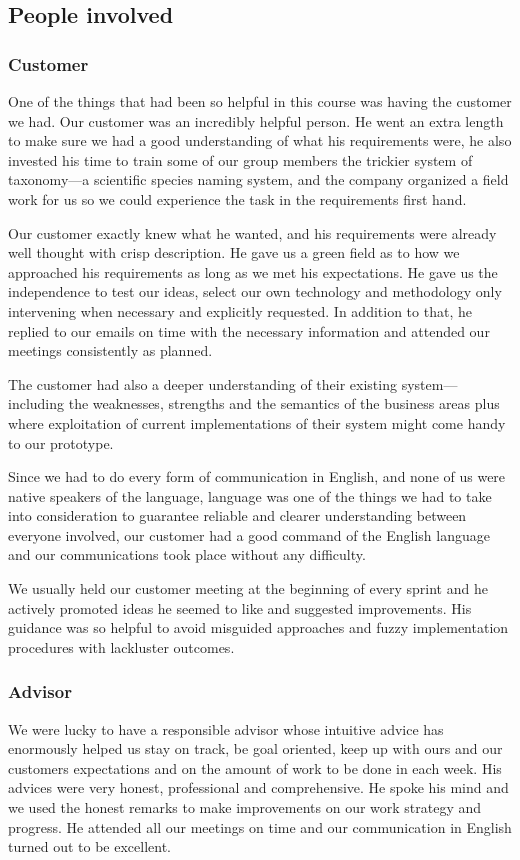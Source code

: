 \subsection{People involved}
	\subsubsection{Customer}
One of the things that had been so helpful in this course was having the customer we had. Our customer was an incredibly helpful person. He went an extra length to make sure we had a good understanding of what his requirements were, he also invested his time to train some of our group members the trickier system of taxonomy---a scientific species naming system, and the company organized a field work for us so we could experience the task in the requirements first hand.

Our customer exactly knew what he wanted, and his requirements were already well thought with crisp description. He gave us a green field as to how we approached his requirements as long as we met his expectations. He gave us the independence to test our ideas, select our own technology and methodology only intervening when necessary and explicitly requested. In addition to that, he replied to our emails on time with the necessary information and attended our meetings consistently as planned.

The customer had also a deeper understanding of their existing system---including the weaknesses, strengths and the semantics of the business areas plus where exploitation of current implementations of their system might come handy to our prototype.

Since we had to do every form of communication in English, and none of us were native speakers of the language, language was one of the things we had to take into consideration to guarantee reliable and clearer understanding between everyone involved, our customer had a good command of the English language and our communications took place without any difficulty.

We usually held our customer meeting at the beginning of every sprint and he actively promoted ideas he seemed to like and suggested improvements.  His guidance was so helpful to avoid misguided approaches and fuzzy implementation procedures with lackluster outcomes.

	\subsubsection{Advisor}
We were lucky to have a responsible advisor whose intuitive advice has enormously helped us stay on track, be goal oriented, keep up with ours and our customers expectations and on the amount of work to be done in each week. His advices were very honest, professional and comprehensive. He spoke his mind and we used the honest remarks to make improvements on our work strategy and progress. He attended all our meetings on time and our communication in English turned out to be excellent.

